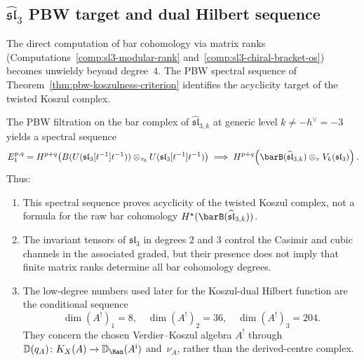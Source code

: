 \subsection{\texorpdfstring{$\widehat{\mathfrak{sl}}_3$ PBW target and dual Hilbert sequence}{sl-3 PBW target and dual Hilbert sequence}}

The direct computation of bar cohomology via matrix ranks
(Computations~\ref{comp:sl3-modular-rank}
and~\ref{comp:sl3-chiral-bracket-os}) becomes unwieldy beyond degree~$4$.
The PBW spectral sequence of Theorem~\ref{thm:pbw-koszulness-criterion}
identifies the acyclicity target of the twisted Koszul complex.

\begin{proposition}
\label{prop:sl3-pbw-ss}
The PBW filtration on the bar complex of $\widehat{\mathfrak{sl}}_{3,k}$ at
generic level $k \neq -h^\vee = -3$ yields a spectral sequence
\[
E_1^{p,q} =
H^{p+q}\!\left(
B(U(\mathfrak{sl}_3[t^{-1}]t^{-1}))\otimes_{\tau_0}
U(\mathfrak{sl}_3[t^{-1}]t^{-1})
\right)
\;\Longrightarrow\;
H^{p+q}\!\left(\barB(\widehat{\mathfrak{sl}}_{3,k})
\otimes_\tau V_k(\mathfrak{sl}_3)\right).
\]
Thus:
\begin{enumerate}[label=\textup{(\roman*)}]
\item This spectral sequence proves acyclicity of the twisted Koszul
 complex, not a formula for the raw bar cohomology
 $H^\star(\barB(\widehat{\mathfrak{sl}}_{3,k}))$.
\item The invariant tensors of $\mathfrak{sl}_3$ in degrees $2$ and $3$
 control the Casimir and cubic channels in the associated graded, but
 their presence does not imply that finite matrix ranks determine all
 bar cohomology degrees.
\item The low-degree numbers used later for the Koszul-dual Hilbert
 function are the conditional sequence
 \[
 \dim(A^!)_1=8,\quad \dim(A^!)_2=36,\quad
 \dim(A^!)_3=204.
 \]
 They concern the chosen Verdier--Koszul algebra $A^!$ through
 $\mathbb D(q_A)\colon K_X(A)\to\mathbb D_{\Ran}(A^{\mathrm i})$
 and~$\nu_A$, rather than the derived-centre complex.
\end{enumerate}
\end{proposition}

